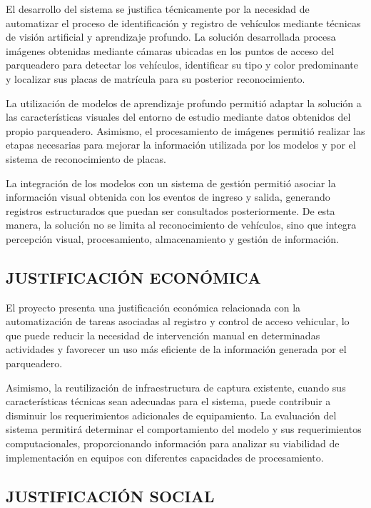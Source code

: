 El desarrollo del sistema se justifica técnicamente por la necesidad de
automatizar el proceso de identificación y registro de vehículos mediante
técnicas de visión artificial y aprendizaje profundo. La solución desarrollada
procesa imágenes obtenidas mediante cámaras ubicadas en los puntos de
acceso del parqueadero para detectar los vehículos, identificar su tipo y color
predominante y localizar sus placas de matrícula para su posterior reconocimiento.

La utilización de modelos de aprendizaje profundo permitió adaptar la solución
a las características visuales del entorno de estudio mediante datos obtenidos
del propio parqueadero. Asimismo, el procesamiento de imágenes permitió realizar
las etapas necesarias para mejorar la información utilizada por los modelos y
por el sistema de reconocimiento de placas.

La integración de los modelos con un sistema de gestión permitió asociar la
información visual obtenida con los eventos de ingreso y salida, generando
registros estructurados que puedan ser consultados posteriormente. De esta
manera, la solución no se limita al reconocimiento de vehículos, sino que
integra percepción visual, procesamiento, almacenamiento y gestión de información.

\subsection*{JUSTIFICACIÓN ECONÓMICA}

El proyecto presenta una justificación económica relacionada con la
automatización de tareas asociadas al registro y control de acceso vehicular, lo
que puede reducir la necesidad de intervención manual en determinadas actividades
y favorecer un uso más eficiente de la información generada por el parqueadero.

Asimismo, la reutilización de infraestructura de captura existente, cuando sus
características técnicas sean adecuadas para el sistema, puede contribuir a
disminuir los requerimientos adicionales de equipamiento. La evaluación del
sistema permitirá determinar el comportamiento del modelo y sus requerimientos
computacionales, proporcionando información para analizar su viabilidad de
implementación en equipos con diferentes capacidades de procesamiento.

\subsection*{JUSTIFICACIÓN SOCIAL}

